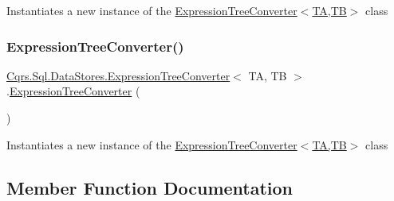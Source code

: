 Instantiates a new instance of the \hyperlink{classCqrs_1_1Sql_1_1DataStores_1_1ExpressionTreeConverter_a6c0d0c72deab71e40aa9e1526fd82593_a6c0d0c72deab71e40aa9e1526fd82593}{Expression\+Tree\+Converter$<$\+T\+A,\+T\+B$>$} class 

\mbox{\label{classCqrs_1_1Sql_1_1DataStores_1_1ExpressionTreeConverter_a817ef7144b04df19798d7c5c718818b7_a817ef7144b04df19798d7c5c718818b7}} 
\subsubsection{\texorpdfstring{Expression\+Tree\+Converter()}{ExpressionTreeConverter()}\hspace{0.1cm}{\footnotesize\ttfamily [2/2]}}
{\footnotesize\ttfamily \hyperlink{classCqrs_1_1Sql_1_1DataStores_1_1ExpressionTreeConverter}{Cqrs.\+Sql.\+Data\+Stores.\+Expression\+Tree\+Converter}$<$ TA, TB $>$.\hyperlink{classCqrs_1_1Sql_1_1DataStores_1_1ExpressionTreeConverter}{Expression\+Tree\+Converter} (\begin{DoxyParamCaption}{ }\end{DoxyParamCaption})\hspace{0.3cm}{\ttfamily [protected]}}



Instantiates a new instance of the \hyperlink{classCqrs_1_1Sql_1_1DataStores_1_1ExpressionTreeConverter_a6c0d0c72deab71e40aa9e1526fd82593_a6c0d0c72deab71e40aa9e1526fd82593}{Expression\+Tree\+Converter$<$\+T\+A,\+T\+B$>$} class 



\subsection{Member Function Documentation}
\mbox{\label{classCqrs_1_1Sql_1_1DataStores_1_1ExpressionTreeConverter_abd0d906a5b8abd8520874104d3bfcad0_abd0d906a5b8abd8520874104d3bfcad0}} 
